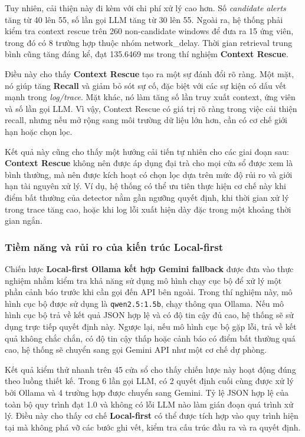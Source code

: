 Tuy nhiên, cải thiện này đi kèm với chi phí xử lý cao hơn. Số \textit{candidate alerts} tăng từ 40 lên 55, số lần gọi LLM tăng từ 30 lên 55. Ngoài ra, hệ thống phải kiểm tra context rescue trên 260 non-candidate windows để đưa ra 15 ứng viên, trong đó có 8 trường hợp thuộc nhóm network\_delay. Thời gian retrieval trung bình cũng tăng đáng kể, đạt 135.6469 ms trong thí nghiệm \textbf{Context Rescue}.

Điều này cho thấy \textbf{Context Rescue} tạo ra một sự đánh đổi rõ ràng. Một mặt, nó giúp tăng \textbf{Recall} và giảm bỏ sót sự cố, đặc biệt với các sự kiện có dấu vết mạnh trong \textit{log/trace}. Mặt khác, nó làm tăng số lần truy xuất context, ứng viên và số lần gọi LLM. Vì vậy, Context Rescue có giá trị rõ ràng trong việc cải thiện recall, nhưng nếu mở rộng sang môi trường dữ liệu lớn hơn, cần có cơ chế giới hạn hoặc chọn lọc.

Kết quả này cũng cho thấy một hướng cải tiến tự nhiên cho các giai đoạn sau: \textbf{Context Rescue} không nên được áp dụng đại trà cho mọi cửa sổ được xem là bình thường, mà nên được kích hoạt có chọn lọc dựa trên mức độ rủi ro và giới hạn tài nguyên xử lý. Ví dụ, hệ thống có thể ưu tiên thực hiện cơ chế này khi điểm bất thường của detector nằm gần ngưỡng quyết định, khi thời gian xử lý trong trace tăng cao, hoặc khi log lỗi xuất hiện dày đặc trong một khoảng thời gian ngắn.
\subsubsection{Tiềm năng và rủi ro của kiến trúc Local-first}

Chiến lược \textbf{Local-first Ollama kết hợp Gemini fallback} được đưa vào thực nghiệm nhằm kiểm tra khả năng sử dụng mô hình chạy cục bộ để xử lý một phần cảnh báo trước khi cần gọi đến API bên ngoài. Trong thí nghiệm này, mô hình cục bộ được sử dụng là \texttt{qwen2.5:1.5b}, chạy thông qua Ollama. Nếu mô hình cục bộ trả về kết quả JSON hợp lệ và có độ tin cậy đủ cao, hệ thống sẽ sử dụng trực tiếp quyết định này. Ngược lại, nếu mô hình cục bộ gặp lỗi, trả về kết quả không chắc chắn, có độ tin cậy thấp hoặc cảnh báo có điểm bất thường quá cao, hệ thống sẽ chuyển sang gọi Gemini API như một cơ chế dự phòng.

Kết quả kiểm thử nhanh trên 45 cửa sổ cho thấy chiến lược này hoạt động đúng theo luồng thiết kế. Trong 6 lần gọi LLM, có 2 quyết định cuối cùng được xử lý bởi Ollama và 4 trường hợp được chuyển sang Gemini. Tỷ lệ JSON hợp lệ của toàn bộ quy trình đạt 1.0 và không có lỗi LLM nào làm gián đoạn quá trình xử lý. Điều này cho thấy cơ chế \textbf{Local-first} có thể được tích hợp vào quy trình hiện tại mà không phá vỡ các bước ghi vết, kiểm tra cấu trúc đầu ra và ra quyết định.

